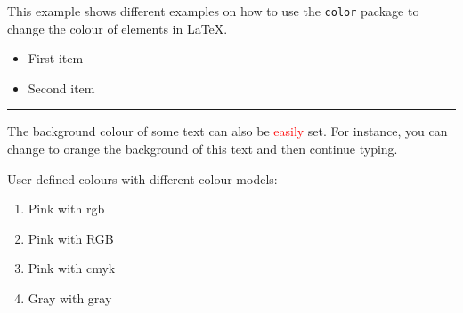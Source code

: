 \documentclass{article}
\begin{document}
This example shows different examples on how to use the \texttt{color} package
to change the colour of elements in \LaTeX.

\begin{itemize}
\color{ForestGreen}
\item First item
\item Second item
\end{itemize}

\noindent
{\color{RubineRed} \rule{\linewidth}{0.5mm} }

The background colour of some text can also be \textcolor{red}{easily} set. For
instance, you can change to orange the background of \colorbox{BurntOrange}{this
text} and then continue typing.


User-defined colours with different colour models:

\begin{enumerate}
\item \textcolor{mypink1}{Pink with rgb}
\item \textcolor{mypink2}{Pink with RGB}
\item \textcolor{mypink3}{Pink with cmyk}
\item \textcolor{mygray}{Gray with gray}
\end{enumerate}
\end{document}
